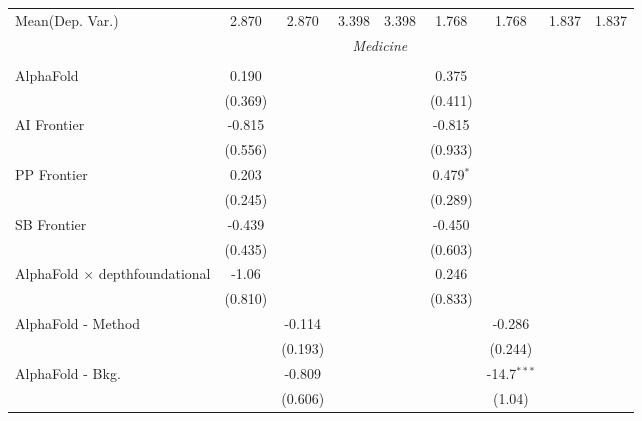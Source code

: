 \begin{tabular}{lcccccccc}
Mean(Dep. Var.) & 2.870 & 2.870 & 3.398 & 3.398 & 1.768 & 1.768 & 1.837 & 1.837 \\
 & \multicolumn{6}{c}{\textit{Medicine}} \\ \\
   AlphaFold                                      & 0.190   &               &       &       & 0.375       &               &      &   \\   
                                                  & (0.369) &               &       &       & (0.411)     &               &      &   \\   
   AI Frontier                                    & -0.815  &               &       &       & -0.815      &               &      &   \\   
                                                  & (0.556) &               &       &       & (0.933)     &               &      &   \\   
   PP Frontier                                    & 0.203   &               &       &       & 0.479$^{*}$ &               &      &   \\   
                                                  & (0.245) &               &       &       & (0.289)     &               &      &   \\   
   SB Frontier                                    & -0.439  &               &       &       & -0.450      &               &      &   \\   
                                                  & (0.435) &               &       &       & (0.603)     &               &      &   \\   
   AlphaFold $\times$ depthfoundational           & -1.06   &               &       &       & 0.246       &               &      &   \\   
                                                  & (0.810) &               &       &       & (0.833)     &               &      &   \\   
   AlphaFold - Method                             &         & -0.114        &       &       &             & -0.286        &      &   \\   
                                                  &         & (0.193)       &       &       &             & (0.244)       &      &   \\   
   AlphaFold - Bkg.                               &         & -0.809        &       &       &             & -14.7$^{***}$ &      &   \\   
                                                  &         & (0.606)       &       &       &             & (1.04)        &      &   \\   

\end{tabular}
